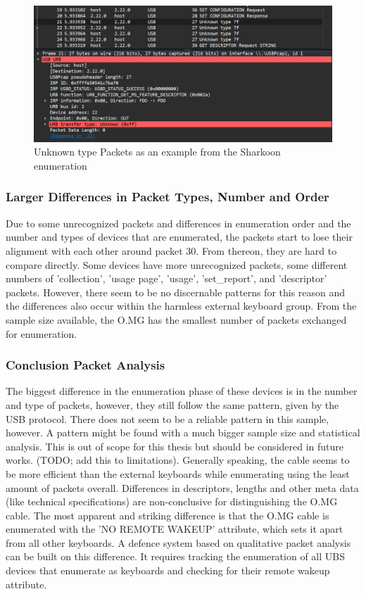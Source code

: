 \begin{figure}[H]
    \centering
    \includegraphics[width=0.75\linewidth]{visuals/unknownPacketsSharkoon.png}
    \caption{Unknown type Packets as an example from the Sharkoon enumeration}
    \label{fig:unknownPacketsSharkoon}
\end{figure}


\subsubsection{Larger Differences in Packet Types, Number and Order}

Due to some unrecognized packets and differences in enumeration order and the number and types of devices that are enumerated, the packets start to lose their alignment with each other around packet 30. From thereon, they are hard to compare directly. Some devices have more unrecognized packets, some different numbers of 'collection', 'usage page', 'usage', 'set\_report', and 'descriptor' packets. However, there seem to be no discernable patterns for this reason and the differences also occur within the harmless external keyboard group. From the sample size available, the O.MG has the smallest number of packets exchanged for enumeration. 


\subsubsection{Conclusion Packet Analysis}

The biggest difference in the enumeration phase of these devices is in the number and type of packets, however, they still follow the same pattern, given by the USB protocol. There does not seem to be a reliable pattern in this sample, however. A pattern might be found with a much bigger sample size and statistical analysis. This is out of scope for this thesis but should be considered in future works. (TODO; add this to limitations). Generally speaking, the cable seems to be more efficient than the external keyboards while enumerating using the least amount of packets overall.
Differences in descriptors, lengths and other meta data (like technical specifications) are non-conclusive for distinguishing the O.MG cable. 
The most apparent and striking difference is that the O.MG cable is enumerated with the 'NO REMOTE WAKEUP' attribute, which sets it apart from all other keyboards.
A defence system based on qualitative packet analysis can be built on this difference. It requires tracking the enumeration of all UBS devices that enumerate as keyboards and checking for their remote wakeup attribute. 

